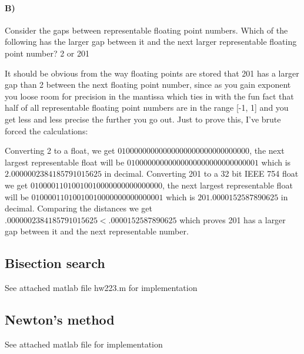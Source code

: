 \documentclass{article}
\begin{document}
\paragraph{B)}
Consider the gaps between representable floating point numbers. Which of the following has the larger gap between it and the next larger representable floating point number? 2 or 201

It should be obvious from the way floating points are stored that 201 has a larger gap than 2 between the next floating point number, since as you gain exponent you loose room for precision in the mantissa which ties in with the fun fact that half of all representable floating point numbers are in the range [-1, 1] and you get less and less precise the further you go out. Just to prove this, I've brute forced the calculations: 

Converting 2 to a float, we get $01000000000000000000000000000000$, the next largest representable float will be $01000000000000000000000000000001$ which is $2.0000002384185791015625$ in decimal. Converting 201 to a 32 bit IEEE 754 float we get $01000011010010010000000000000000$, the next largest representable float will be $01000011010010010000000000000001$ which is $201.0000152587890625$ in decimal. Comparing the distances we get $.0000002384185791015625 < .0000152587890625$ which proves 201 has a larger gap between it and the next representable number. 

\subsection{Bisection search}
See attached matlab file hw223.m for implementation 

\subsection{Newton’s method}
See attached matlab file for implementation 
\end{document}
